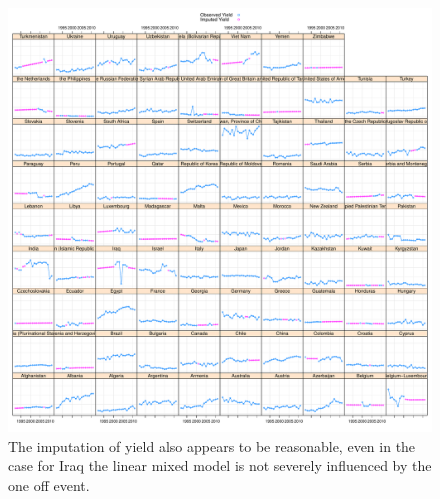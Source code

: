 \documentclass[nojss]{jss}\usepackage[]{graphicx}\usepackage[]{color}
\makeatletter
\def\maxwidth{ %
  \ifdim\Gin@nat@width>\linewidth
    \linewidth
  \else
    \Gin@nat@width
  \fi
}
\newenvironment{knitrout}{}{} %
\makeatother
\begin{document}
\begin{knitrout}
\color{fgcolor}\begin{figure}[!ht]


{\centering \includegraphics[width=\maxwidth]{figure/grape-yield-imputed} 

}

\caption[The imputation of yield also appears to be reasonable, even in the case for Iraq the linear mixed model is not severely influenced by the one off event]{The imputation of yield also appears to be reasonable, even in the case for Iraq the linear mixed model is not severely influenced by the one off event.\label{fig:grape-yield-imputed}}
\end{figure}


\end{knitrout}
\end{document}
